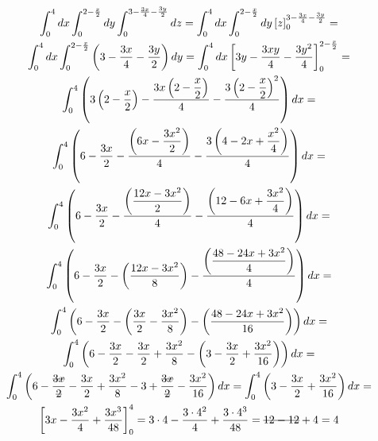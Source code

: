 \begin{enumerate}
	\begin{gather*}
		 \int_0^4 dx \int_0^{2 - \frac{x}{2}} dy \int_0^{3 - \frac{3x}{4} - \frac{3y}{2}} dz = \int_0^4 dx \int_0^{2 - \frac{x}{2}} dy \left[z\right]_0^{3 - \frac{3x}{4} - \frac{3y}{2}} =\\ \int_0^4 dx \int_0^{2 - \frac{x}{2}} \left(3 - \frac{3x}{4} - \frac{3y}{2}\right) dy = \int_0^4 dx \left[3y - \frac{3xy}{4} - \frac{3y^2}{4}\right]_0^{2 - \frac{x}{2}} =\\ \int_0^4 \left(3\left(2 - \dfrac{x}{2}\right) - \frac{3x\left(2 - \dfrac{x}{2}\right)}{4} - \frac{3\left(2 - \dfrac{x}{2}\right)^2}{4}\right) dx =\\ \int_0^4 \left(6 - \dfrac{3x}{2} - \dfrac{\left(6x - \dfrac{3x^2}{2}\right)}{4} - \dfrac{3\left(4 - 2x + \dfrac{x^2}{4}\right)}{4}\right) dx =\\ \int_0^4 \left(6 - \dfrac{3x}{2} - \dfrac{\left(\dfrac{12x - 3x^2}{2}\right)}{4} - \dfrac{\left(12 - 6x + \dfrac{3x^2}{4}\right)}{4}\right) dx =\\ \int_0^4 \left(6 - \dfrac{3x}{2} - \left(\dfrac{12x - 3x^2}{8}\right) - \dfrac{\left(\dfrac{48 - 24x + 3x^2}{4}\right)}{4}\right) dx =\\ \int_0^4 \left(6 - \dfrac{3x}{2} - \left(\dfrac{3x}{2} - \dfrac{3x^2}{8}\right) - \left(\dfrac{48 - 24x + 3x^2}{16}\right)\right) dx =\\ \int_0^4 \left(6 - \dfrac{3x}{2} - \dfrac{3x}{2} + \dfrac{3x^2}{8} - \left(3 - \dfrac{3x}{2} + \dfrac{3x^2}{16}\right)\right) dx =\\ \int_0^4 \left(6 - \dfrac{\overstrike{3x}}{\overstrike{2}} - \dfrac{3x}{2} + \dfrac{3x^2}{8} - 3 + \dfrac{\overstrike{3x}}{\overstrike{2}} - \dfrac{3x^2}{16}\right) dx = \int_0^4 \left(3 - \dfrac{3x}{2} + \dfrac{3x^2}{16}\right) dx =\\ \left[3x - \dfrac{3x^2}{4} + \dfrac{3x^3}{48}\right]_0^4 = 3\cdot4 - \dfrac{3\cdot4^2}{4} + \dfrac{3\cdot4^3}{48} = \overstrike{12 - 12} + 4 = 4
	\end{gather*}	
\end{enumerate}